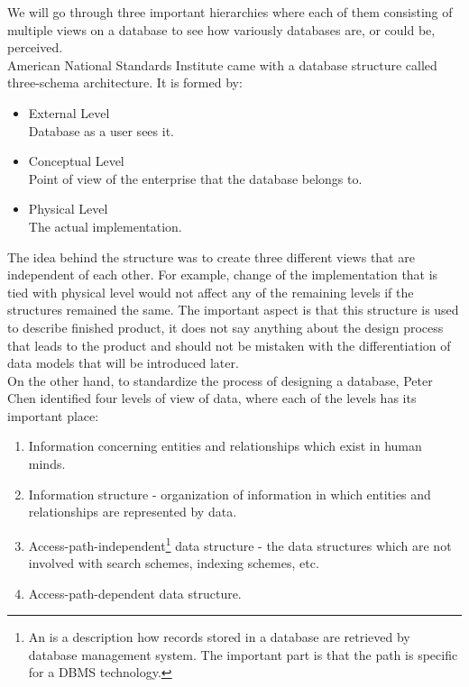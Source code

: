 We will go through three important hierarchies where each of them consisting of multiple views on a database to see how variously databases are, or could be, perceived.\\

American National Standards Institute \cite{ANSIArchitecture75} came with a database structure called three-schema architecture. It is formed by:
\begin{itemize}
	\item External Level \\ Database as a user sees it. 
	\item Conceptual Level \\ Point of view of the enterprise that the database belongs to.
	\item Physical Level \\ The actual implementation.
\end{itemize}

The idea behind the structure was to create three different views that are independent of each other. 
For example, change of the implementation that is tied with physical level would not affect any of the remaining levels if the structures remained the same. 
The important aspect is that this structure is used to describe finished product, it does not say anything about the design process that leads to the product and should not be mistaken with the differentiation of data models that will be introduced later.\\

On the other hand, to standardize the process of designing a database, Peter Chen \cite{Chen76theentity-relationship} identified four levels of view of data, where each of the levels has its important place: \\
\begin{enumerate}
	\item Information concerning entities and relationships which exist in human minds.
	\item Information structure - organization of information in which entities and relationships are represented by data.
	\item Access-path-independent\footnote{An  is a description how records stored in a database are retrieved by database management system\cite{AccessPathDefiniton}. The important part is that the path is specific for a DBMS technology.} data structure - the data structures which are not involved with search schemes, indexing schemes, etc.
	\item Access-path-dependent data structure.
\end{enumerate}


